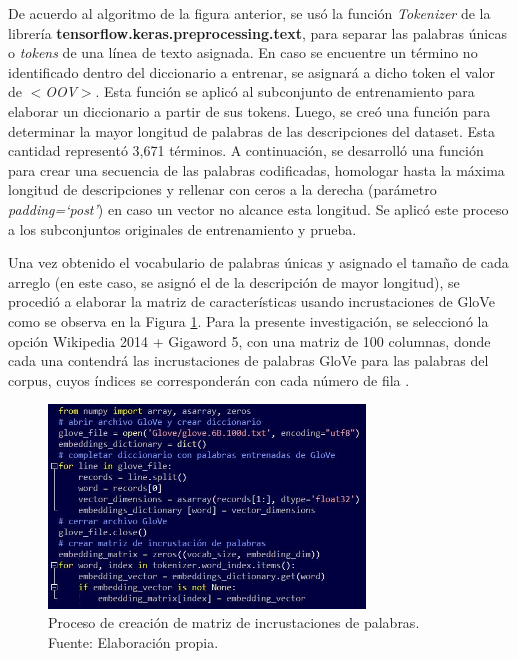 De acuerdo al algoritmo de la figura anterior, se usó la función \textit{Tokenizer} de la librería \textbf{tensorflow.keras.preprocessing.text}, para separar las palabras únicas o \textit{tokens} de una línea de texto asignada. En caso se encuentre un término no identificado dentro del diccionario a entrenar, se asignará a dicho token el valor de \textit{$<$OOV$>$}. Esta función se aplicó al subconjunto de entrenamiento para elaborar un diccionario a partir de sus tokens. Luego, se creó una función para determinar la mayor longitud de palabras de las descripciones del dataset. Esta cantidad representó 3,671 términos. A continuación, se desarrolló una función para crear una secuencia de las palabras codificadas, homologar hasta la máxima longitud de descripciones y rellenar con ceros a la derecha (parámetro \textit{padding=`post'}) en caso un vector no alcance esta longitud. Se aplicó este proceso a los subconjuntos originales de entrenamiento y prueba.

Una vez obtenido el vocabulario de palabras únicas y asignado el tamaño de cada arreglo (en este caso, se asignó el de la descripción de mayor longitud), se procedió a elaborar la matriz de características usando incrustaciones de GloVe como se observa en la Figura \ref{4:fig32}. Para la presente investigación, se seleccionó la opción Wikipedia 2014 + Gigaword 5, con una matriz de 100 columnas, donde cada una contendrá las incrustaciones de palabras GloVe para las palabras del corpus, cuyos índices se corresponderán con cada número de fila \parencite{tec_malik2019pythonnlp}.

\begin{figure}[!ht]
	\begin{center}
		\includegraphics[width=0.75\textwidth]{4/figures/description_embedding_matrix.jpg}
		\caption[Proceso de creación de matriz de incrustaciones de palabras]{Proceso de creación de matriz de incrustaciones de palabras.\\
			Fuente: Elaboración propia.}
		\label{4:fig32}
	\end{center}
\end{figure}

